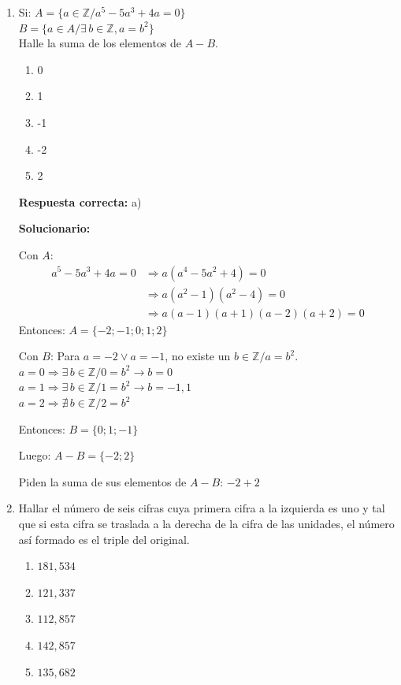 \begin{enumerate}
	
	
	\item Si: 
	$A = \{ a \in \mathbb{Z} / a^5 - 5a^3 + 4a = 0 \}$ \\
	$B = \{ a \in A / \exists \, b \in \mathbb{Z}, a = b^2 \}$ \\
	Halle la suma de los elementos de $A - B$.
	
	\begin{enumerate}[label=\alph*)]
	\item 0
	\item 1
	\item -1
	\item -2
	\item 2
	\end{enumerate}
	
	\textbf{Respuesta correcta:} a)
	
	\vspace{2mm}
	\textbf{Solucionario:}
	
	Con $A$: 
	\begin{align*}
		a^5 - 5a^3 + 4a = 0 &\Rightarrow a(a^4 - 5a^2 + 4) = 0 \\
		&\Rightarrow a(a^2 - 1)(a^2 - 4) = 0 \\
		&\Rightarrow a(a-1)(a+1)(a-2)(a+2) = 0
	\end{align*}
	Entonces: $A = \{ -2; -1; 0; 1; 2 \}$
	
	Con $B$: Para $a = -2 \vee a = -1$, no existe un $b \in \mathbb{Z} / a = b^2$. \\
	$a = 0 \Rightarrow \exists \, b \in \mathbb{Z} / 0 = b^2 \rightarrow b = 0$ \\
	$a = 1 \Rightarrow \exists \, b \in \mathbb{Z} / 1 = b^2 \rightarrow b = -1, 1$ \\
	$a = 2 \Rightarrow \nexists \, b \in \mathbb{Z} / 2 = b^2$
	
	Entonces: $B = \{ 0; 1; -1 \}$
	
	Luego: $A - B = \{ -2; 2 \}$
	
	Piden la suma de sus elementos de $A - B$: $-2 + 2 $
	
	
	\vspace{6mm}
	

	\item Hallar el número de seis cifras cuya primera cifra a la izquierda es uno y tal que si esta cifra se traslada a la derecha de la cifra de las unidades, el número así formado es el triple del original.
	
	\begin{enumerate}[label=\alph*)]
		\item $181,534$
		\item $121,337$
		\item $112,857$
		\item $142,857$
		\item $135,682$
	\end{enumerate}
	

\end{enumerate}
